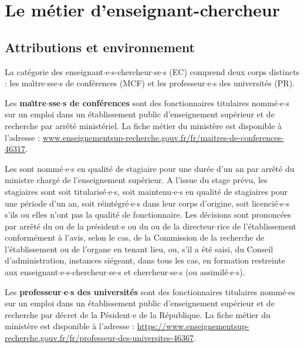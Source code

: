 \chapter{Le m\'etier d'enseignant-chercheur}


\section{Attributions et environnement}
La cat\'egorie des enseignant$\cdot$e$\cdot$s-chercheur$\cdot$se$\cdot$s (EC) comprend deux corps distincts :
les ma\^\i tre$\cdot$sse$\cdot$s de conf\'erences (MCF) et les professeur$\cdot$e$\cdot$s des universit\'es (PR).

Les \textbf{ma\^\i  tre$\cdot$sse$\cdot$s de conf\'erences} sont des fonctionnaires titulaires
nomm\'e$\cdot$e$\cdot$s sur un emploi dans un \'etablissement public d'enseignement
sup\'erieur et de recherche par arr\^et\'e minist\'eriel. La fiche m\'etier du minist\`ere est disponible \`a l'adresse :
\url{www.enseignementsup-recherche.gouv.fr/fr/maitres-de-conferences-46317}.

Les \MCF sont nomm\'e$\cdot$e$\cdot$s en qualit\'e de stagiaire pour une dur\'ee d'un an par arr\^ et\'e du ministre charg\'e de l'enseignement sup\'erieur.
A l'issue du stage pr\'evu, les \MCF stagiaires sont soit titularis\'e$\cdot$e$\cdot$s, soit maintenu$\cdot$e$\cdot$s en qualit\'e de stagiaires pour une p\'eriode d'un an, soit r\'eint\'egr\'e$\cdot$e$\cdot$s dans leur corps d'origine, soit licenci\'e$\cdot$e$\cdot$s s'ils ou elles n'ont pas la qualit\'e de fonctionnaire. Les d\'ecisions sont prononc\'ees par arr\^ et\'e du ou de la pr\'esident$\cdot$e ou du ou de la directeur$\cdot$rice de l'\'etablissement conform\'ement \`a l'avis, selon le cas, de la Commission de la recherche de l'\'etablissement ou de l'organe en tenant lieu, ou, s'il a \'et\'e saisi, du Conseil d'administration, instances si\'egeant, dans tous les cas, en formation restreinte aux enseignant$\cdot$e$\cdot$s-chercheur$\cdot$se$\cdot$s et chercheur$\cdot$se$\cdot$s (ou assimil\'e$\cdot$e$\cdot$s).

Les \textbf{professeur$\cdot$e$\cdot$s des universit\'es} sont des fonctionnaires titulaires nomm\'e$\cdot$es sur un emploi dans un \'etablissement public d'enseignement
sup\'erieur et de recherche par d\'ecret de la P\'esident$\cdot$e de la R\'epublique. La fiche m\'etier du minist\`ere est disponible \`a l'adresse : \url{https://www.enseignementsup-recherche.gouv.fr/fr/professeur-des-universites-46367}.

